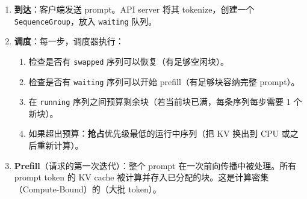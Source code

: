\begin{enumerate}
  \item \textbf{到达}：客户端发送 prompt。API server 将其 tokenize，创建一个 \texttt{SequenceGroup}，放入 \texttt{waiting} 队列。
  \item \textbf{调度}：每一步，调度器执行：

\begin{enumerate}
  \item 检查是否有 \texttt{swapped} 序列可以恢复（有足够空闲块）。
  \item 检查是否有 \texttt{waiting} 序列可以开始 prefill（有足够块容纳完整 prompt）。
  \item 在 \texttt{running} 序列之间预算剩余块（若当前块已满，每条序列每步需要 1 个新块）。
  \item 如果超出预算：\textbf{抢占}优先级最低的运行中序列（把 KV 换出到 CPU 或之后重新计算）。
\end{enumerate}
  \item \textbf{Prefill}（请求的第一次迭代）：整个 prompt 在一次前向传播中被处理。所有 prompt token 的 KV cache 被计算并存入已分配的块。这是计算密集（Compute-Bound）的（大批 token）。

\end{enumerate}
